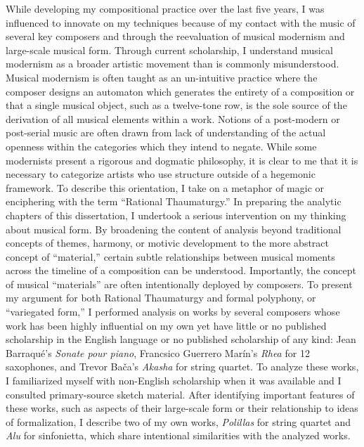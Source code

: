 
While developing my compositional practice over the last five years, I was influenced to innovate on my techniques because of my contact with the music of several key composers and through the reevaluation of musical modernism and large-scale musical form. Through current scholarship, I understand musical modernism as a broader artistic movement than is commonly misunderstood. Musical modernism is often taught as an un-intuitive practice where the composer designs an automaton which generates the entirety of a composition or that a single musical object, such as a twelve-tone row, is the sole source of the derivation of all musical elements within a work.  Notions of a post-modern or post-serial music are often drawn from lack of understanding of the actual openness within the categories which they intend to negate. While some modernists present a rigorous and dogmatic philosophy, it is clear to me that it is necessary to categorize artists who use structure outside of a hegemonic framework. To describe this orientation, I take on a metaphor of magic or enciphering with the term ``Rational Thaumaturgy.'' In preparing the analytic chapters of this dissertation, I undertook a serious intervention on my thinking about musical form. By broadening the content of analysis beyond traditional concepts of themes, harmony, or motivic development to the more abstract concept of ``material,'' certain subtle relationships between musical moments across the timeline of a composition can be understood. Importantly, the concept of musical ``materials'' are often intentionally deployed by composers. To present my argument for both Rational Thaumaturgy and formal polyphony, or ``variegated form,'' I performed analysis on works by several composers whose work has been highly influential on my own yet have little or no published scholarship in the English language or no published scholarship of any kind: Jean Barraqué's \textit{Sonate pour piano}, Francsico Guerrero Marín's \textit{Rhea} for 12 saxophones, and Trevor Bača's \textit{Akasha} for string quartet. To analyze these works, I familiarized myself with non-English scholarship when it was available and I consulted primary-source sketch material. After identifying important features of these works, such as aspects of their large-scale form or their relationship to ideas of formalization, I describe two of my own works, \textit{Polillas} for string quartet and \textit{Alu} for sinfonietta, which share intentional similarities with the analyzed works.